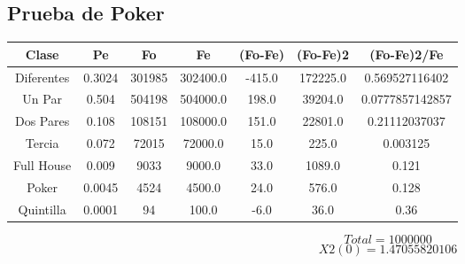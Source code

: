 \documentclass{article}
\begin{document}
\subsection{Prueba de Poker}
\begin{tabular}{|c|c|c|c|c|c|c|}
Clase&Pe&Fo&Fe&(Fo{-}Fe)&(Fo{-}Fe)2&(Fo{-}Fe)2/Fe\\
\hline
Diferentes&0.3024&301985&302400.0&{-}415.0&172225.0&0.569527116402\\
\hline
Un Par&0.504&504198&504000.0&198.0&39204.0&0.0777857142857\\
\hline
Dos Pares&0.108&108151&108000.0&151.0&22801.0&0.21112037037\\
\hline
Tercia&0.072&72015&72000.0&15.0&225.0&0.003125\\
\hline
Full House&0.009&9033&9000.0&33.0&1089.0&0.121\\
\hline
Poker&0.0045&4524&4500.0&24.0&576.0&0.128\\
\hline
Quintilla&0.0001&94&100.0&{-}6.0&36.0&0.36\\
\end{tabular}
$$
Total = 1000000
$$
$$
X2(0) = 1.47055820106
$$
\end{document}
